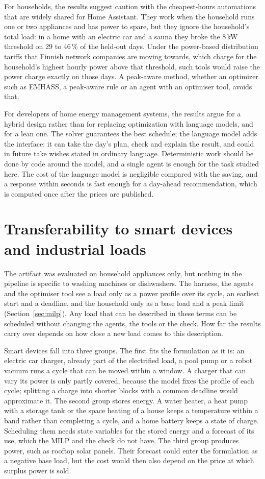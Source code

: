 \documentclass[12pt,a4paper]{report}
\begin{document}
For households, the results suggest caution with the cheapest-hours
automations that are widely shared for Home Assistant. They work when
the household runs one or two appliances and has power to spare, but
they ignore the household's total load: in a home with an electric car
and a sauna they broke the 8\,kW threshold on 29 to 46\,\% of the
held-out days. Under the power-based distribution tariffs that Finnish
network companies are moving towards, which charge for the household's
highest hourly power above that threshold, such tools would raise the
power charge exactly on those days. A peak-aware method, whether an
optimizer such as EMHASS, a peak-aware rule or an agent with an
optimiser tool, avoids that.

For developers of home energy management systems, the results argue
for a hybrid design rather than for replacing optimization with language
models, and for a lean one. The solver guarantees the best schedule; the
language model adds the interface: it can take the day's plan, check
and explain the result, and could in future take wishes stated in
ordinary language. Deterministic work should be done by code around the
model, and a single agent is enough for the task studied here. The cost
of the language model is negligible compared with the saving, and a
response within seconds is fast enough for a day-ahead recommendation,
which is computed once after the prices are published.

\section{Transferability to smart devices and industrial loads}
\label{sec:transferability}

The artifact was evaluated on household appliances only, but nothing in
the pipeline is specific to washing machines or dishwashers. The
harness, the agents and the optimiser tool see a load only as a power
profile over its cycle, an earliest start and a deadline, and the
household only as a base load and a peak limit (Section~\ref{sec:milp}).
Any load that can be described in these terms can be scheduled without
changing the agents, the tools or the check. How far the results carry
over depends on how close a new load comes to this description.

Smart devices fall into three groups. The first fits the formulation as
it is: an electric car charger, already part of the electrified load, a
pool pump or a robot vacuum runs a cycle that can be moved within a
window. A charger that can vary its power is only partly covered,
because the model fixes the profile of each cycle; splitting a charge
into shorter blocks with a common deadline would approximate it. The
second group stores energy. A water heater, a heat pump with a storage
tank or the space heating of a house keeps a temperature within a band
rather than completing a cycle, and a home battery keeps a state of
charge. Scheduling them needs state variables for the stored energy and
a forecast of its use, which the MILP and the check do not have. The
third group produces power, such as rooftop solar panels. Their forecast
could enter the formulation as a negative base load, but the cost would
then also depend on the price at which surplus power is sold.
\end{document}
